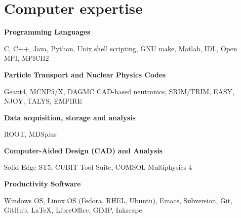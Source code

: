 \documentclass[10pt]{article}
\begin{document}
\section{Computer expertise}

\textbf{Programming Languages}
\begin{innerlist}
  \item C, C$+$$+$, Java, Python, Unix shell scripting, GNU make, Matlab, IDL, Open MPI, MPICH2
\end{innerlist}

\halfblankline

\textbf{Particle Transport and Nuclear Physics Codes}
\begin{innerlist}
  \item Geant4, MCNP5/X, DAGMC CAD-based neutronics, SRIM/TRIM, EASY, NJOY, TALYS, EMPIRE
\end{innerlist}

\halfblankline

\textbf{Data acquisition, storage and analysis}
\begin{innerlist}
  \item ROOT, MDSplus
\end{innerlist}

\halfblankline

\textbf{Computer-Aided Design (CAD) and Analysis}
\begin{innerlist}
  \item Solid Edge ST5, CUBIT Tool Suite, COMSOL Multiphysics 4
\end{innerlist}

\halfblankline

\textbf{Productivity Software}
\begin{innerlist}
  \item Windows OS, Linux OS (Fedora, RHEL, Ubuntu), Emacs,
    Subversion, Git, GitHub, \LaTeX, LibreOffice, GIMP, Inkscape
\end{innerlist} 






\end{document}
